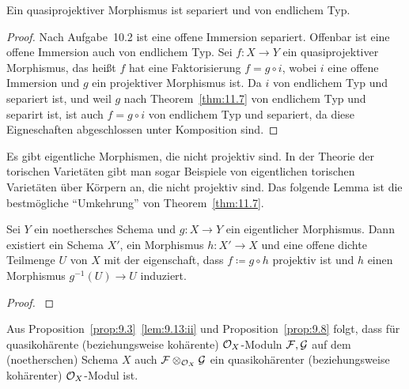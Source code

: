 \begin{kor}
\label{kor:11.8}
	Ein quasiprojektiver Morphismus ist separiert und von endlichem Typ.
	\begin{proof}
		Nach Aufgabe~10.2 ist eine offene Immersion separiert. Offenbar ist eine offene Immersion auch von endlichem Typ. Sei $f\colon X \to Y$ ein quasiprojektiver Morphismus, das heißt $f$ hat eine Faktorisierung $f=g\circ i$, wobei $i$ eine offene Immersion und $g$ ein projektiver Morphismus ist. Da $i$ von endlichem Typ und separiert ist, und weil $g$ nach Theorem~\ref{thm:11.7} von endlichem Typ und separirt ist, ist auch $f=g\circ i$ von endlichem Typ und separiert, da diese Eigneschaften abgeschlossen unter Komposition sind.
	\end{proof}
\end{kor}

Es gibt eigentliche Morphismen, die nicht projektiv sind. In der Theorie der torischen Varietäten gibt man sogar Beispiele von eigentlichen torischen Varietäten über Körpern an, die nicht projektiv sind. Das folgende Lemma ist die bestmögliche \enquote{Umkehrung} von Theorem~\ref{thm:11.7}.

\begin{lem}
\label{lem:11.9}
	Sei $Y$ ein noethersches Schema und $g \colon X \to Y$ ein eigentlicher Morphismus. Dann existiert ein Schema $X'$, ein Morphismus $h\colon X' \to X$ und eine offene dichte Teilmenge $U$ von $X$ mit der eigenschaft, dass $f \coloneqq g \circ h$ projektiv ist und $h$ einen Morphismus $g^{-1}(U)\to U$ induziert.
	\begin{center}
	\end{center}
	\begin{proof}
		\cite[{}5.6]{grothendieck1961elements}
	\end{proof}
\end{lem}

\begin{bem}
\label{bem:11.10}
	Aus Proposition~\ref{prop:9.3}~\ref{lem:9.13:ii} und Proposition~\ref{prop:9.8} folgt, dass für quasikohärente (beziehungsweise kohärente) $\mathcal{O}_X$-Moduln $\mathcal{F}, \mathcal{G}$ auf dem (noetherschen) Schema $X$ auch $\mathcal{F}\otimes_{\mathcal{O}_X}\mathcal{G}$ ein quasikohärenter (beziehungsweise kohärenter) $\mathcal{O}_X$-Modul ist.
\end{bem}

